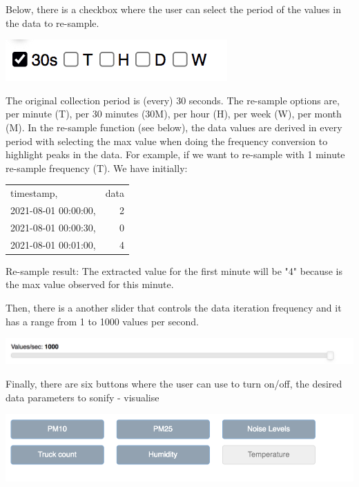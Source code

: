 \documentclass[11pt]{article}
\begin{document}
Below, there is a checkbox where the user can select the period of the values in the data to re-sample.

\begin{center}
\includegraphics[width=.9\linewidth]{./resample_checkbox.png}
\end{center}

The original collection period is (every) 30 seconds.  The re-sample options are, per minute (T), per 30 minutes (30M), per hour (H), per week (W), per month (M).  In the re-sample function (see below), the data values are derived in every period with selecting the max value when doing the frequency conversion to highlight peaks in the data.  For example, if we want to re-sample with 1 minute re-sample frequency (T). We have initially:
\begin{center}
\begin{tabular}{lr}
\hline
timestamp, & data\\
2021-08-01 00:00:00, & 2\\
2021-08-01 00:00:30, & 0\\
2021-08-01 00:01:00, & 4\\
\hline
\end{tabular}
\end{center}

Re-sample result: The extracted value for the first minute will be "4" because is the max value observed for this minute.

Then, there is a another slider that controls the data iteration frequency and it has a range from 1 to 1000 values per second.

\begin{center}
\includegraphics[width=.9\linewidth]{./values_sec.png}
\end{center}

Finally, there are six buttons where the user can use to turn on/off, the desired data parameters to sonify - visualise

\begin{center}
\includegraphics[width=.9\linewidth]{./synth_onoff.png}
\end{center}
\end{document}

